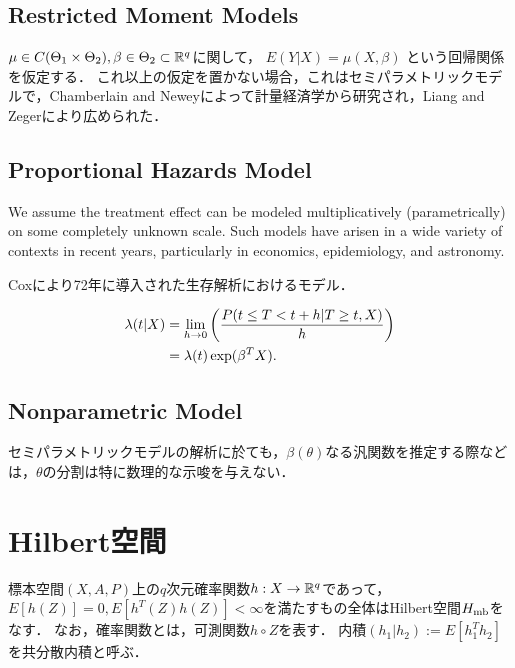 \documentclass[uplatex,dvipdfmx]{jsreport}
\begin{document}
\subsection{Restricted Moment Models}

$\mu\in C(\Theta_1\times\Theta_2),\beta\in\Theta_2\subset\mathbb{R}^q$に関して，
$E(Y|X)=\mu(X,\beta)$
という回帰関係を仮定する．
これ以上の仮定を置かない場合，これはセミパラメトリックモデルで，Chamberlain and Neweyによって計量経済学から研究され，Liang and Zegerにより広められた．

\subsection{Proportional Hazards Model}

\begin{tcolorbox}[colframe=ForestGreen, colback=ForestGreen!10!white,breakable,colbacktitle=ForestGreen!40!white,coltitle=black,fonttitle=\bfseries\sffamily,
title=]
    We assume the treatment effect can be modeled multiplicatively (parametrically) on some completely unknown scale.
    Such models have arisen in a wide variety of contexts in recent years, particularly in economics, epidemiology, and astronomy.\cite{Bickel}
\end{tcolorbox}

Coxにより72年に導入された生存解析におけるモデル．

\begin{align*}
    \lambda(t|X)&=\lim_{h\to0}\left(\frac{P(t\le T<t+h|T\ge t,X)}{h}\right)\\
    &=\lambda(t)\exp(\beta^TX).
\end{align*}

\subsection{Nonparametric Model}

セミパラメトリックモデルの解析に於ても，$\beta(\theta)$なる汎関数を推定する際などは，$\theta$の分割は特に数理的な示唆を与えない．

\section{Hilbert空間}

\begin{example}
    標本空間$(X,A,P)$上の$q$次元確率関数$h:X\to\mathbb{R}^q$であって，$E[h(Z)]=0,E[h^T(Z)h(Z)]<\infty$を満たすもの全体はHilbert空間$H_{\mathrm{mb}}$をなす．
    なお，確率関数とは，可測関数$h\circ Z$を表す．
    内積$(h_1|h_2):=E[h_1^Th_2]$を共分散内積と呼ぶ．
\end{example}
\end{document}

